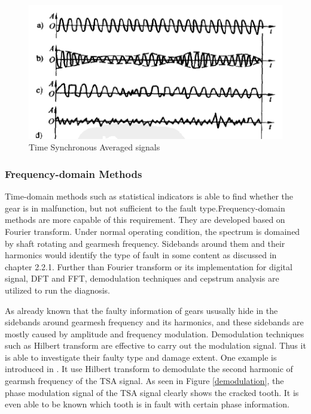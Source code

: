 \begin{figure}
	\centering
	\includegraphics{TSA}
	\caption{Time Synchronous Averaged signals \cite{chen}}
	\label{tsa}
\end{figure}


\subsubsection{Frequency-domain Methods}

Time-domain methods such as statistical indicators is able to find whether the gear is in malfunction, but not sufficient to the fault type.Frequency-domain methods are more capable of this requirement. They are developed based on Fourier transform. Under normal operating condition, the spectrum is domained by shaft rotating and gearmesh frequency. Sidebands around them and their harmonics would identify the type of fault in some content as discussed in chapter 2.2.1.
Further than Fourier transform or its implementation for digital signal, DFT and FFT, demodulation techniques and cepstrum analysis are utilized to run the diagnosis.

As already known that the faulty information of gears ususally hide in the sidebands around gearmesh frequency and its harmonics, and these sidebands are mostly caused by amplitude and frequency modulation. Demodulation techniques such as Hilbert transform are effective to carry out the modulation signal. Thus it is able to investigate their faulty type and damage extent.
One example is introduced in \cite{mc4}. It use Hilbert transform to demodulate the second harmonic of gearmsh frequency of the TSA signal. As seen in Figure \ref{demodulation}, the phase modulation signal of the TSA signal clearly shows the cracked tooth. It is even able to be known which tooth is in fault with certain phase information.

